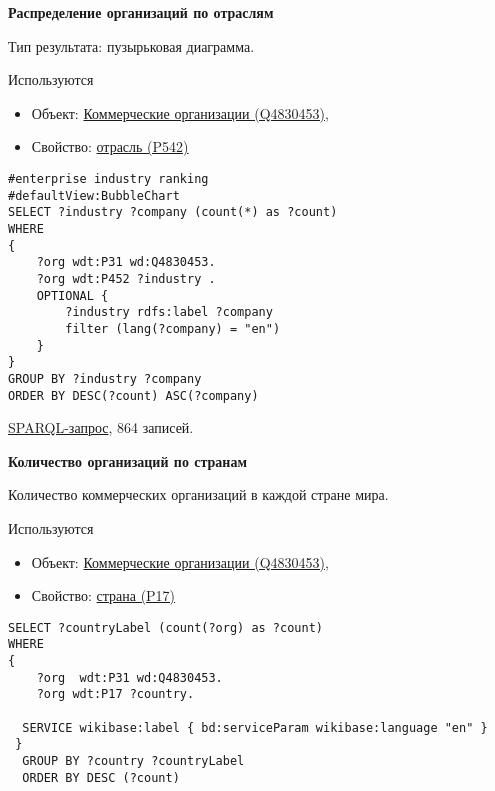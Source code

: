 \textbf{Распределение организаций по отраслям}

Тип результата: пузырьковая диаграмма.

Используются

\begin{itemize}
    \item Объект: \href{https://www.wikidata.org/wiki/Q4830453}{Коммерческие организации (Q4830453)},
    \item Свойство: \href{https://www.wikidata.org/wiki/Property:P452}{отрасль (P542)}
\end{itemize}

\begin{lstlisting}[language=SPARQL]
#enterprise industry ranking
#defaultView:BubbleChart
SELECT ?industry ?company (count(*) as ?count)
WHERE 
{
    ?org wdt:P31 wd:Q4830453.
    ?org wdt:P452 ?industry .
    OPTIONAL {
		?industry rdfs:label ?company
		filter (lang(?company) = "en")
	}
}
GROUP BY ?industry ?company
ORDER BY DESC(?count) ASC(?company)
\end{lstlisting}

\href{https://query.wikidata.org/#%23enterprise%20industry%20ranking%0A%23defaultView%3ABubbleChart%0ASELECT%20%3Findustry%20%3Fcompany%20%28count%28%2a%29%20as%20%3Fcount%29%0AWHERE%20%0A%7B%0A%20%20%20%20%3Forg%20wdt%3AP31%20wd%3AQ4830453.%0A%20%20%20%20%3Forg%20wdt%3AP452%20%3Findustry%20.%0A%20%20%20%20OPTIONAL%20%7B%0A%09%09%3Findustry%20rdfs%3Alabel%20%3Fcompany%0A%09%09filter%20%28lang%28%3Fcompany%29%20%3D%20%22en%22%29%0A%09%7D%0A%7D%0AGROUP%20BY%20%3Findustry%20%3Fcompany%0AORDER%20BY%20DESC%28%3Fcount%29%20ASC%28%3Fcompany%29%0A}{SPARQL-запрос}, 864 записей.

\textbf{Количество организаций по странам}

Количество коммерческих организаций в каждой стране мира.

Используются

\begin{itemize}
    \item Объект: \href{https://www.wikidata.org/wiki/Q4830453}{Коммерческие организации (Q4830453)},
    \item Свойство: \href{https://www.wikidata.org/wiki/Property:P17}{страна (P17)}
\end{itemize}

\begin{lstlisting}[language=SPARQL]
SELECT ?countryLabel (count(?org) as ?count)
WHERE
{
    ?org  wdt:P31 wd:Q4830453.
    ?org wdt:P17 ?country.

  SERVICE wikibase:label { bd:serviceParam wikibase:language "en" }
 }
  GROUP BY ?country ?countryLabel
  ORDER BY DESC (?count)
\end{lstlisting}

